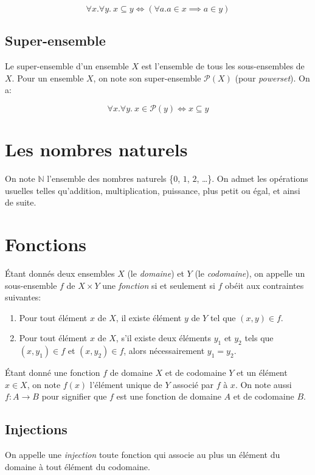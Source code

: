 \[
\forall x. \forall y.\ x \subseteq y \iff (\forall a. a \in x \implies a \in y)
\]

\subsection{Super-ensemble}

Le super-ensemble d'un ensemble $X$ est l'ensemble de tous les sous-ensembles de $X$.
Pour un ensemble $X$, on note son super-ensemble $\mathcal{P}(X)$ (pour \textit{powerset}).
On a:

\[
\forall x. \forall y.\ x \in \mathcal{P}(y) \iff x \subseteq y
\]

\section{Les nombres naturels}

On note $\mathbb{N}$ l'ensemble des nombres naturels \{$0$, $1$, $2$, \dots\}.
On admet les opérations usuelles telles qu'addition, multiplication, puissance, plus petit ou égal, et ainsi de suite.

\section{Fonctions}

Étant donnés deux ensembles $X$ (le \textit{domaine}) et $Y$ (le \textit{codomaine}), on appelle un sous-ensemble $f$ de $X \times Y$ une \og \textit{fonction} \fg{} si et seulement si $f$ obéit aux contraintes suivantes:
\begin{enumerate}
\item Pour tout élément $x$ de $X$, il existe élément $y$ de $Y$ tel que $(x, y) \in f$.
\item Pour tout élément $x$ de $X$, s'il existe deux éléments $y_1$ et $y_2$ tels que $(x, y_1) \in f$ et $(x, y_2) \in f$, alors nécessairement $y_1 = y_2$.
\end{enumerate}
Étant donné une fonction $f$ de domaine $X$ et de codomaine $Y$ et un élément $x \in X$, on note $f(x)$ l'élément unique de $Y$ associé par $f$ à $x$.
On note aussi $f : A \to B$ pour signifier que $f$ est une fonction de domaine $A$ et de codomaine $B$.

\subsection{Injections}

On appelle une \og \textit{injection} \fg{} toute fonction qui associe au plus un élément du domaine à tout élément du codomaine.

